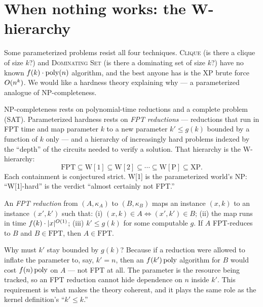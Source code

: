 \section{When nothing works: the W-hierarchy}

Some parameterized problems resist all four techniques. \textsc{Clique} (is there a clique of size $k$?) and \textsc{Dominating Set} (is there a dominating set of size $k$?) have no known $f(k)\cdot\operatorname{poly}(n)$ algorithm, and the best anyone has is the XP brute force $O(n^k)$. We would like a hardness theory explaining why --- a parameterized analogue of NP-completeness.

\begin{intuitionbox}
NP-completeness rests on polynomial-time reductions and a complete problem (SAT). Parameterized hardness rests on \emph{FPT reductions} --- reductions that run in FPT time and map parameter $k$ to a new parameter $k'\le g(k)$ bounded by a function of $k$ only --- and a hierarchy of increasingly hard problems indexed by the ``depth'' of the circuits needed to verify a solution. That hierarchy is the W-hierarchy:
\[
  \mathrm{FPT}\subseteq \mathrm{W[1]}\subseteq \mathrm{W[2]}\subseteq\cdots\subseteq \mathrm{W[P]}\subseteq \mathrm{XP}.
\]
Each containment is conjectured strict. W[1] is the parameterized world's NP: ``W[1]-hard'' is the verdict ``almost certainly not FPT.''
\end{intuitionbox}

\begin{definition}\label{ch25:def-fptred}
An \emph{FPT reduction} from $(A,\kappa_A)$ to $(B,\kappa_B)$ maps an instance $(x,k)$ to an instance $(x',k')$ such that: (i) $(x,k)\in A \iff (x',k')\in B$; (ii) the map runs in time $f(k)\cdot\lvert x\rvert^{O(1)}$; (iii) $k'\le g(k)$ for some computable $g$. If $A$ FPT-reduces to $B$ and $B\in\mathrm{FPT}$, then $A\in\mathrm{FPT}$.
\end{definition}

\begin{whybox}
Why must $k'$ stay bounded by $g(k)$? Because if a reduction were allowed to inflate the parameter to, say, $k'=n$, then an $f(k')\operatorname{poly}$ algorithm for $B$ would cost $f(n)\operatorname{poly}$ on $A$ --- not FPT at all. The parameter is the resource being tracked, so an FPT reduction cannot hide dependence on $n$ inside $k'$. This requirement is what makes the theory coherent, and it plays the same role as the kernel definition's ``$k'\le k$.''
\end{whybox}

